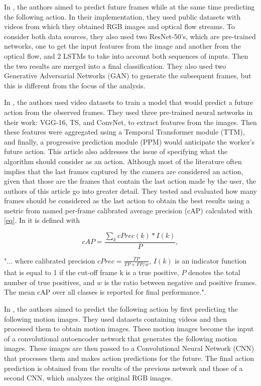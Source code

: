 In \cite{Gammulle2019}, the authors aimed to predict future frames while at the same time predicting the following action. In their implementation, they used public datasets with videos from which they obtained RGB images and optical flow streams. To consider both data sources, they also used two ResNet-50's, which are pre-trained networks, one to get the input features from the image and another from the optical flow, and 2 LSTMs to take into account both sequences of inputs. Then the two results are merged into a final classification. They also used two Generative Adversarial Networks (GAN) to generate the subsequent frames, but this is different from the focus of the analysis.

In \cite{Wang2021}, the authors used video datasets to train a model that would predict a future action from the observed frames. They used three pre-trained neural networks in their work: VGG-16, TS, and ConvNet, to extract features from the images. Then these features were aggregated using a Temporal Transformer module (TTM), and finally, a progressive prediction module (PPM) would anticipate the worker's future action. This article also addresses the issue of specifying what the algorithm should consider as an action. Although most of the literature often implies that the last frames captured by the camera are considered an action, given that those are the frames that contain the last action made by the user, the authors of this article go into greater detail. They tested and evaluated how many frames should be considered as the last action to obtain the best results using a metric from \cite{Geest2016} named per-frame calibrated average precision (cAP) calculated with \eqref{eq}. In \cite{Wang2021} it is defined with

\begin{equation}
cAP=\frac{\sum_k cPrec(k) * I(k)}{P},
\label{eq}
\end{equation}

"... where  calibrated  precision $cPrec=\frac{TP}{TP+FP/w}$, $I(k)$ is an indicator function that is equal to 1 if the cut-off frame k is a true positive, $P$ denotes the total number of true positives, and $w$ is the ratio between negative and positive frames. The mean cAP over all classes is reported for final performance.".

In \cite{Rodriguez2019}, the authors aimed to predict the following action by first predicting the following motion images. They used datasets containing videos and then processed them to obtain motion images. These motion images become the input of a convolutional autoencoder network that generates the following motion images. These images are then passed to a Convolutional Neural Network (CNN) that processes them and makes action predictions for the future. The final action prediction is obtained from the results of the previous network and those of a second CNN, which analyzes the original RGB images.

